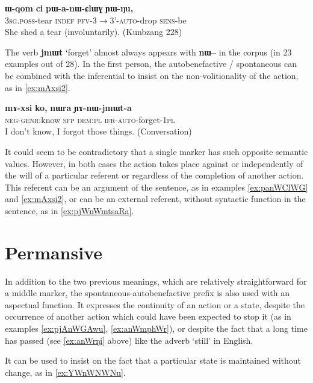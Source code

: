 \documentclass[oldfontcommands,oneside,a4paper,11pt]{article}
\newcommand{\ipa}[1]{\textbf{{\phon\mbox{#1}}}} %
\begin{document}
\begin{exe}
\ex \label{ex:panWClWG}
\gll \ipa{ɯ-qom} 	\ipa{ci} 	\ipa{pɯ-a-nɯ-ɕlɯɣ} 	\ipa{ɲɯ-ŋu,} \\
\textsc{3sg.poss}-tear \textsc{indef} \textsc{pfv-3$\rightarrow$3'-auto}-drop \textsc{sens}-be \\
\glt She shed a tear (involuntarily). (Kunbzang 228)
\end{exe}

The verb \ipa{jmɯt} `forget' almost always appears with \ipa{nɯ--} in the corpus (in 23 examples out of 28). In the first person, the autobenefactive / spontaneous can be combined with the inferential to insist on the non-volitionality of the action, as in  \ref{ex:mAxsi2}.

\begin{exe}
 \ex \label{ex:mAxsi2}
 \gll
\ipa{mɤ-xsi}  	\ipa{ko,}  	\ipa{nɯra}  	\ipa{ɲɤ-nɯ-jmɯt-a}  \\
\textsc{neg-genr}:know \textsc{sfp} \textsc{dem:pl} \textsc{ifr-auto}-forget-\textsc{1pl} \\
\glt I don't know, I forgot those things. (Conversation)
\end{exe}

It could seem to be contradictory that a single marker has such opposite semantic values. However, in both cases the action takes place against or independently of the will of a particular referent or regardless of the completion of another action. This referent can be an argument of the sentence, as in examples \ref{ex:panWClWG} and \ref{ex:mAxsi2}, or can be an external referent, without syntactic function in the sentence, as in \ref{ex:pjWnWmtsaRa}. 


 
 
\section{Permansive}
In addition to the two previous meanings, which are relatively straightforward for a middle marker, the spontaneous-autobenefactive prefix is also used with an aspectual function. It expresses the continuity of an action or a state, despite the occurrence of another action which could have been expected to stop it (as in examples \ref{ex:pjAnWGAwu}, \ref{ex:anWmphWr}), or despite the fact that a long time has passed (see \ref{ex:anWrŋi} above) like the adverb `still' in English. 

It can be used to insist on the fact  that a particular state is maintained without change, as in \ref{ex:YWnWNWNu}.
\end{document}
